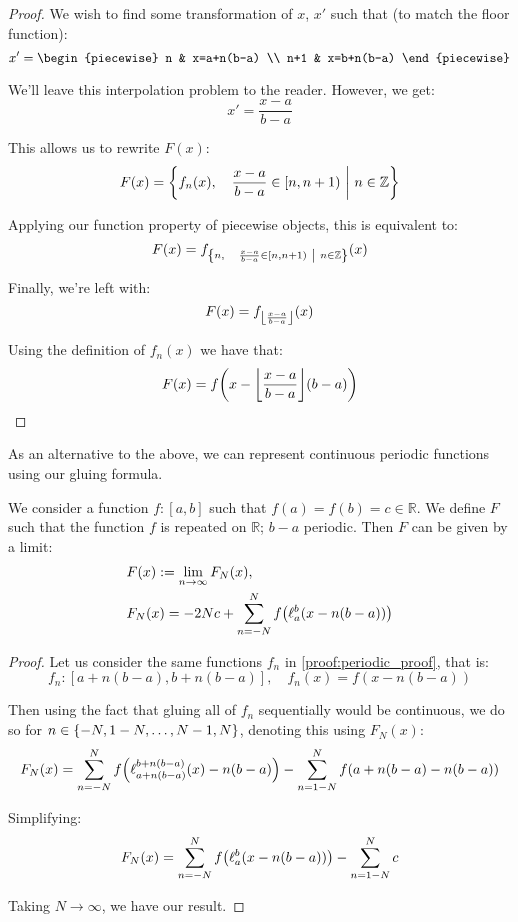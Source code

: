 \begin{theorem}
\begin{proof}
        We wish to find some transformation of $x$, $x'$ such that (to match the floor function):
        $$
            x' = \begin{piecewise}
                n & x=a+n(b-a) \\
                n+1 & x=b+n(b-a)
            \end{piecewise}
        $$

        We'll leave this interpolation problem to the reader. However, we get:
        $$
            x'=\frac{x-a}{b-a}
        $$

        This allows us to rewrite $F(x)$:
        $$
            F(x) = \pwobj{f_n(x)}{\frac{x-a}{b-a}\in[n,n+1)}{n\in\mathbb{Z}}
        $$

        Applying our function property of piecewise objects, this is equivalent to:
        $$
            F(x) = f_{\pwobj{n}{\frac{x-a}{b-a}\in[n,n+1)}{n\in\mathbb{Z}}}(x)
        $$

        Finally, we're left with:
        $$
            F(x) = f_{\floor*{\frac{x-a}{b-a}}}(x)
        $$

        Using the definition of $f_n(x)$ we have that:
        $$
            F(x) = f\paren*{x-\floor*{\frac{x-a}{b-a}}(b-a)}
        $$
    \end{proof}
\end{theorem}

As an alternative to the above, we can represent continuous periodic functions using our gluing formula.

\begin{theorem}
    We consider a function $f:[a,b]$ such that $f(a)=f(b)=c\in\mathbb{R}$. We define $F$ such that the function $f$ is repeated on $\mathbb{R}$; $b-a$ periodic. Then $F$ can be given by a limit:
    \begin{align*}
        & F(x) := \lim_{n\to\infty}{F_N(x)}, \\
        & F_N(x) = -2Nc +\sum_{n=-N}^{N}{f\paren*{\ell_{a}^{b}(x-n(b-a))}}
    \end{align*}

    \begin{proof}
        Let us consider the same functions $f_n$ in \autoref{proof:periodic_proof}, that is:
        $$
            f_n:[a+n(b-a),b+n(b-a)],\quad f_n(x)=f(x-n(b-a))
        $$

        Then using the fact that gluing all of $f_n$ sequentially would be continuous, we do so for $n\in\br*{-N,1-N,\dots,N-1,N}$, denoting this using $F_N(x)$:
        $$
            F_N(x) = \sum_{n=-N}^{N}{f\paren*{\ell_{a+n(b-a)}^{b+n(b-a)}(x)-n(b-a)}}-\sum_{n=1-N}^{N}{f\paren*{a+n(b-a)-n(b-a)}}
        $$

        Simplifying:
        $$
            F_N(x) = \sum_{n=-N}^{N}{f\paren*{\ell_{a}^{b}(x-n(b-a))}}-\sum_{n=1-N}^{N}{c}
        $$

        Taking $N\to\infty$, we have our result.
    \end{proof}
\end{theorem}

\newpage